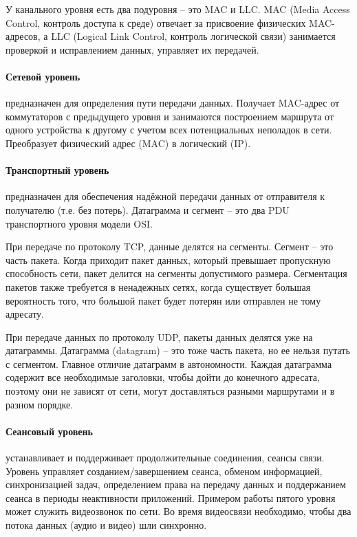 У канального уровня есть два подуровня -- это MAC и LLC. MAC (Media Access Control, контроль доступа к среде) отвечает за присвоение физических MAC-адресов, а LLC (Logical Link Control, контроль логической связи) занимается проверкой и исправлением данных, управляет их передачей.

\paragraph*{Сетевой уровень}\label{b17:osi:lev3} предназначен для определения пути передачи данных. Получает MAC-адрес от коммутаторов с предыдущего уровня и занимаются построением маршрута от одного устройства к другому с учетом всех потенциальных неполадок в сети. Преобразует физический адрес (MAC) в логический (IP).

\paragraph*{Транспортный уровень}\label{b17:osi:lev4} предназначен для обеспечения надёжной передачи данных от отправителя к получателю (т.е. без потерь). Датаграмма и сегмент -- это два PDU транспортного уровня модели OSI.

При передаче по протоколу TCP, данные делятся на сегменты. Сегмент -- это часть пакета. Когда приходит пакет данных, который превышает пропускную способность сети, пакет делится на сегменты допустимого размера. Сегментация пакетов также требуется в ненадежных сетях, когда существует большая вероятность того, что большой пакет будет потерян или отправлен не тому адресату.

При передаче данных по протоколу UDP, пакеты данных делятся уже на датаграммы. Датаграмма (datagram) -- это тоже часть пакета, но ее нельзя путать с сегментом. Главное отличие датаграмм в автономности. Каждая датаграмма содержит все необходимые заголовки, чтобы дойти до конечного адресата, поэтому они не зависят от сети, могут доставляться разными маршрутами и в разном порядке.

\paragraph*{Сеансовый уровень}\label{b17:osi:lev5} устанавливает и поддерживает продолжительные соединения, сеансы связи.
Уровень управляет созданием/завершением сеанса, обменом информацией, синхронизацией задач, определением права на передачу данных и поддержанием сеанса в периоды неактивности приложений.
Примером работы пятого уровня может служить видеозвонок по сети. Во время видеосвязи необходимо, чтобы два потока данных (аудио и видео) шли синхронно.

